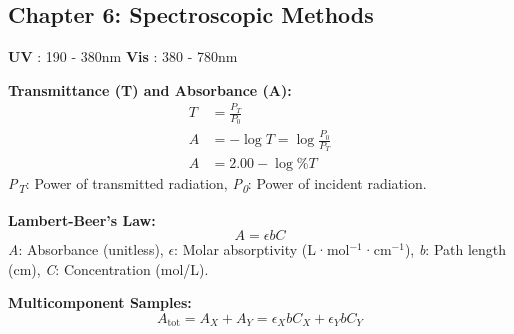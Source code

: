 \subsection*{Chapter 6: Spectroscopic Methods}

\textbf{UV} : 190 - 380nm
\textbf{Vis} : 380 - 780nm  

\textbf{Transmittance (T) and Absorbance (A):}
\begin{align}
T &= \frac{P_T}{P_0} \\
A &= -\log T = \log \frac{P_0}{P_T} \\
A &= 2.00 - \log \%T
\end{align}
\textit{P\textsubscript{T}}: Power of transmitted radiation, \textit{P\textsubscript{0}}: Power of incident radiation.

\vspace{5mm}

\textbf{Lambert-Beer's Law:}
\begin{equation}
A = \epsilon b C
\end{equation}
\textit{A}: Absorbance (unitless), \textit{\(\epsilon\)}: Molar absorptivity (L·mol\(^{-1}\)·cm\(^{-1}\)), \textit{b}: Path length (cm), \textit{C}: Concentration (mol/L).
\vspace{5mm}

\textbf{Multicomponent Samples:}
\begin{equation}
A_{\text{tot}} = A_X + A_Y = \epsilon_X b C_X + \epsilon_Y b C_Y
\end{equation}
